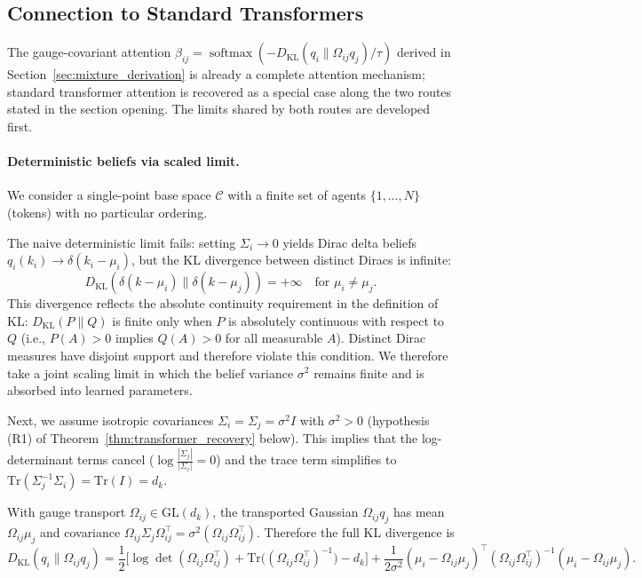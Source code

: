 \subsection{Connection to Standard Transformers}

The gauge-covariant attention $\beta_{ij} = \operatorname{softmax}(-D_{\mathrm{KL}}(q_i \| \Omega_{ij} q_j)/\tau)$ derived in Section~\ref{sec:mixture_derivation} is already a complete attention mechanism; standard transformer attention is recovered as a special case along the two routes stated in the section opening. The limits shared by both routes are developed first.

\paragraph{Deterministic beliefs via scaled limit.}

We consider a single-point base space $\mathcal{C}$ with a finite set of agents $\{1,\dots,N\}$ (tokens) with no particular ordering.

The naive deterministic limit fails: setting $\Sigma_i \to 0$ yields Dirac delta beliefs $q_i(k_i) \to \delta(k_i - \mu_i)$, but the KL divergence between distinct Diracs is infinite:
\begin{equation}
D_{\mathrm{KL}}(\delta(k - \mu_i) \| \delta(k - \mu_j)) = +\infty \quad \text{for } \mu_i \neq \mu_j.
\label{eq:dirac_kl}
\end{equation}
This divergence reflects the absolute continuity requirement in the definition of KL: $D_{\mathrm{KL}}(P \| Q)$ is finite only when $P$ is absolutely continuous with respect to $Q$ (i.e., $P(A) > 0$ implies $Q(A) > 0$ for all measurable $A$). Distinct Dirac measures have disjoint support and therefore violate this condition. We therefore take a joint scaling limit in which the belief variance $\sigma^2$ remains finite and is absorbed into learned parameters.

Next, we assume isotropic covariances $\Sigma_i = \Sigma_j = \sigma^2 I$ with $\sigma^2 > 0$ (hypothesis (R1) of Theorem~\ref{thm:transformer_recovery} below). This implies that the log-determinant terms cancel ($\log\frac{|\Sigma_j|}{|\Sigma_i|} = 0$) and the trace term simplifies to $\mathrm{Tr}(\Sigma_j^{-1}\Sigma_i) = \mathrm{Tr}(I) = d_k$.

With gauge transport $\Omega_{ij} \in \mathrm{GL}(d_k)$, the transported Gaussian $\Omega_{ij}q_j$ has mean $\Omega_{ij}\mu_j$ and covariance $\Omega_{ij}\Sigma_j\Omega_{ij}^\top = \sigma^2(\Omega_{ij}\Omega_{ij}^\top)$. Therefore the full KL divergence is
\begin{equation}
D_{\mathrm{KL}}(q_i \| \Omega_{ij}q_j) = \frac{1}{2}\Big[\log\det(\Omega_{ij}\Omega_{ij}^\top) + \mathrm{Tr}\big((\Omega_{ij}\Omega_{ij}^\top)^{-1}\big) - d_k\Big] + \frac{1}{2\sigma^2}(\mu_i - \Omega_{ij}\mu_j)^\top(\Omega_{ij}\Omega_{ij}^\top)^{-1}(\mu_i - \Omega_{ij}\mu_j).
\end{equation}

